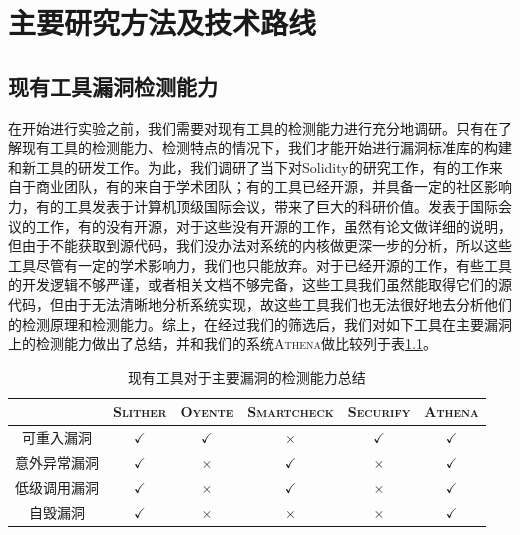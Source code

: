 
\chapter{主要研究方法及技术路线}

\section{现有工具漏洞检测能力}

在开始进行实验之前，我们需要对现有工具的检测能力进行充分地调研。只有在了解现有工具的检测能力、检测特点的情况下，我们才能开始进行漏洞标准库的构建和新工具的研发工作。为此，我们调研了当下对Solidity的研究工作，有的工作来自于商业团队，有的来自于学术团队；有的工具已经开源，并具备一定的社区影响力，有的工具发表于计算机顶级国际会议，带来了巨大的科研价值。发表于国际会议的工作，有的没有开源，对于这些没有开源的工作，虽然有论文做详细的说明，但由于不能获取到源代码，我们没办法对系统的内核做更深一步的分析，所以这些工具尽管有一定的学术影响力，我们也只能放弃。对于已经开源的工作，有些工具的开发逻辑不够严谨，或者相关文档不够完备，这些工具我们虽然能取得它们的源代码，但由于无法清晰地分析系统实现，故这些工具我们也无法很好地去分析他们的检测原理和检测能力。综上，在经过我们的筛选后，我们对如下工具在主要漏洞上的检测能力做出了总结，并和我们的系统\textsc{Athena}做比较列于表\ref{tab:detection_capability}。

\begin{table}
  \centering\small
  \caption{现有工具对于主要漏洞的检测能力总结}
  \begin{tabular}{cccccc}
    \toprule
     & \textsc{Slither} & \textsc{Oyente} & \textsc{Smartcheck} & \textsc{Securify} & \textsc{Athena} \\
     \midrule
    可重入漏洞 & $\checkmark$ & $\checkmark$ & $\times$ & $\checkmark$ & $\checkmark$ \\
    意外异常漏洞 & $\checkmark$ & $\times$ & $\checkmark$ & $\times$ & $\checkmark$ \\
    低级调用漏洞 & $\checkmark$ & $\times$ & $\checkmark$ & $\times$ & $\checkmark$ \\
    自毁漏洞 & $\checkmark$ & $\times$ & $\times$ & $\times$ & $\checkmark$ \\
    \bottomrule
  \end{tabular}
  \label{tab:detection_capability}
\end{table}

